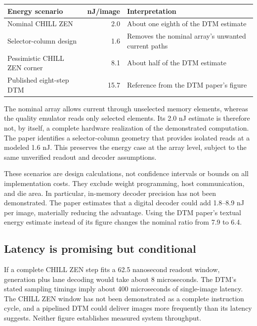 \documentclass[11pt,letterpaper]{article}
\begin{document}
\begin{center}
\small
\begin{tabularx}{\linewidth}{@{}>{\raggedright\arraybackslash}Xr>{\raggedright\arraybackslash}X@{}}
\toprule
Energy scenario & nJ/image & Interpretation \\
\midrule
Nominal CHILL ZEN & 2.0 & About one eighth of the DTM estimate \\
Selector-column design & 1.6 & Removes the nominal array's unwanted current paths \\
Pessimistic CHILL ZEN corner & 8.1 & About half of the DTM estimate \\
Published eight-step DTM & 15.7 & Reference from the DTM paper's figure \\
\bottomrule
\end{tabularx}
\end{center}

The nominal array allows current through unselected memory elements, whereas the quality emulator reads only selected elements. Its 2.0 nJ estimate is therefore not, by itself, a complete hardware realization of the demonstrated computation. The paper identifies a selector-column geometry that provides isolated reads at a modeled 1.6 nJ. This preserves the energy case at the array level, subject to the same unverified readout and decoder assumptions.

These scenarios are design calculations, not confidence intervals or bounds on all implementation costs. They exclude weight programming, host communication, and die area. In particular, in-memory decoder precision has not been demonstrated. The paper estimates that a digital decoder could add 1.8--8.9 nJ per image, materially reducing the advantage. Using the DTM paper's textual energy estimate instead of its figure changes the nominal ratio from 7.9 to 6.4.

\subsection{Latency is promising but conditional}
If a complete CHILL ZEN step fits a 62.5 nanosecond readout window, generation plus lane decoding would take about 8 microseconds. The DTM's stated sampling timings imply about 400 microseconds of single-image latency. The CHILL ZEN window has not been demonstrated as a complete instruction cycle, and a pipelined DTM could deliver images more frequently than its latency suggests. Neither figure establishes measured system throughput.
\end{document}
